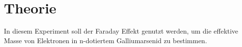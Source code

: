 \section{Theorie}
\label{sec:Theorie}

In diesem Experiment soll der Faraday Effekt genutzt werden, um die effektive 
Masse von Elektronen in n-dotiertem Galliumarsenid zu bestimmen.